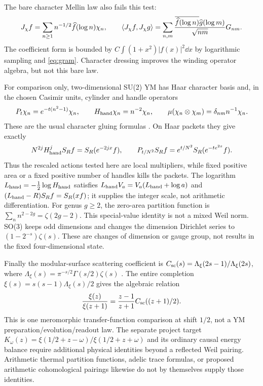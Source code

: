 The bare character Mellin law also fails this test:
\[
J_\chi f=\sum_{n\ge1}n^{-1/2}\widehat f(\log n)\chi_n,
\qquad
\langle J_\chi f,J_\chi g\rangle
=\sum_{n,m}\frac{\overline{\widehat f(\log n)}
\widehat g(\log m)}{\sqrt{nm}}G_{nm}.
\]
The coefficient form is bounded by
$C\int(1+x^2)|f(x)|^2\dd x$ by logarithmic sampling
and \eqref{eq:gram}. Character dressing improves
the winding operator algebra, but not this bare law.

For comparison only, two-dimensional SU(2) YM has
Haar character basis and, in the chosen Casimir units,
cylinder and handle operators
\begin{equation}
P_t\chi_n=e^{-t(n^2-1)}\chi_n,\qquad
H_{\rm hand}\chi_n=n^{-2}\chi_n,\qquad
\mu(\chi_n\otimes\chi_m)=\delta_{nm}n^{-1}\chi_n .
\end{equation}
These are the usual character gluing formulas
\cite[Proposition 5.7]{runkel-szegedy}. On Haar packets
they give exactly
\begin{equation}
N^{2j}H_{\rm hand}^jS_Rf=S_R(e^{-2jx}f),\qquad
P_{t/N^2}S_Rf=e^{t/N^2}S_R(e^{-te^{2x}}f).
\end{equation}
Thus the rescaled actions tested here are local
multipliers, while fixed positive area or a fixed
positive number of handles kills the packets.
The logarithm $L_{\rm hand}=-\tfrac12\log H_{\rm hand}$
satisfies $L_{\rm hand}V_a=V_a(L_{\rm hand}+\log a)$
and $(L_{\rm hand}-R)S_Rf=S_R(xf)$; it supplies the
integer scale, not arithmetic differentiation.
For genus $g\ge2$, the zero-area partition function
is $\sum_n n^{2-2g}=\zeta(2g-2)$. This special-value
identity is not a mixed Weil norm. SO(3) keeps odd
dimensions and changes the dimension Dirichlet
series to $(1-2^{-s})\zeta(s)$. These are changes
of dimension or gauge group, not results in the
fixed four-dimensional state.

Finally the modular-surface scattering coefficient is
$C_{\rm sc}(s)=\Lambda_\xi(2s-1)/\Lambda_\xi(2s)$,
where $\Lambda_\xi(s)=\pi^{-s/2}\Gamma(s/2)\zeta(s)$
\cite[Section 7.3.2]{levitin-strohmaier}.
The entire completion $\xi(s)=s(s-1)\Lambda_\xi(s)/2$
gives the algebraic relation
\begin{equation}
\frac{\xi(z)}{\xi(z+1)}
=\frac{z-1}{z+1}C_{\rm sc}((z+1)/2).
\end{equation}
This is one meromorphic transfer-function comparison
at shift $1/2$, not a YM preparation/evolution/readout
law. The separate project target
$K_\omega(z)=\xi(1/2+z-\omega)/\xi(1/2+z+\omega)$
and its ordinary causal energy balance require
additional physical identities beyond a reflected
Weil pairing. Arithmetic thermal partition functions,
adelic trace formulas, or proposed arithmetic
cohomological pairings likewise do not by themselves
supply those identities.
